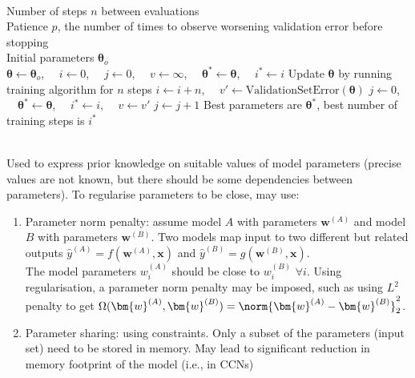 \begin{breakablealgorithm}
\caption{Early Stopping Algorithm}
\begin{algorithmic}
\Require \\
Number of steps $n$ between evaluations\\
Patience $p$, the number of times to observe worsening validation error before stopping\\
Initial parameters $\bm{\theta}_o$\\
    
\State $\bm{\theta} \leftarrow \bm{\theta}_o$, \ \ $i \leftarrow 0$, \ \ $j \leftarrow 0$, \ \ $v \leftarrow \infty$, \ \ $\bm{\theta}^{*} \leftarrow \bm{\theta}$, \ \ $i^* \leftarrow i$
\State Update $\bm{\theta}$ by running training algorithm for $n$ steps
\State $i \leftarrow i + n$, \ \ $v' \leftarrow \text{ValidationSetError}(\bm{\theta})$
\State $j \leftarrow 0$, \ \ $\bm{\theta}^{*} \leftarrow \bm{\theta}$, \ \ $i^* \leftarrow i$, \ \ $v \leftarrow v'$
\EndIf
\State $j \leftarrow j+1$
\EndWhile
\State Best parameters are $\bm{\theta}^*$, best number of training steps is $i^*$

\end{algorithmic}
\end{breakablealgorithm}

\begin{remark} \\
Used to express prior knowledge on suitable values of model parameters (precise values are not known, but there should be some dependencies between parameters). To regularise parameters to be close, may use:
\begin{enumerate}[label=\roman*.]
\setlength{\itemsep}{0pt}
\item Parameter norm penalty: assume model $A$ with parameters $\bm{w}^{(A)}$ and model $B$ with parameters $\bm{w}^{(B)}$. Two models map input to two different but related outputs $\hat{y}^{(A)} = f(\bm{w}^{(A)}, \bm{x})$ and $\hat{y}^{(B)} = g(\bm{w}^{(B)}, \bm{x})$.\\
The model parameters $w_{i}^{(A)}$ should be close to  $w_{i}^{(B)}$ $\forall i$. Using regularisation, a parameter norm penalty may be imposed, such as using $L^2$ penalty to get $\Omega(\bm{w}^{(A)}, \bm{w}^{(B)}) = \norm{\bm{w}^{(A)} - \bm{w}^{(B)}}^2_2$.
\item Parameter sharing: using constraints. Only a subset of the parameters (input set) need to be stored in memory. May lead to significant reduction in memory footprint of the model (i.e., in CCNs)
\end{enumerate}
\end{remark}

